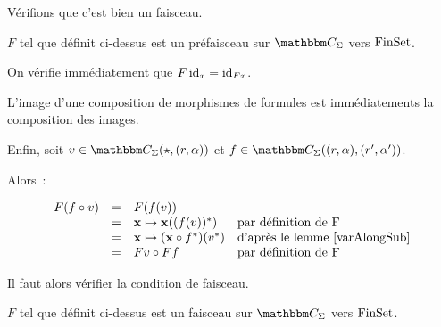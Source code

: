 Vérifions que c'est bien un faisceau.

\begin{lem}
    $F$ tel que définit ci-dessus est un préfaisceau sur $\C_\Sigma$ vers $\text{FinSet}$.
\end{lem}

\begin{pv}
    On vérifie immédiatement que $F\operatorname{id}_x = \operatorname{id}_{Fx}$.

    L'image d'une composition de morphismes de formules est immédiatements la composition
    des images.

    Enfin, soit $v\in\C_\Sigma(\star, (r,\alpha))$ et
    $f\in\C_\Sigma((r,\alpha), (r',\alpha'))$.

    Alors~:
    
    \[\begin{array}{rcll}
        F(f\circ v) & = & F(f(v)) & \\
                    & = & \mathbf{x}\mapsto \mathbf{x}((f(v))^*) 
                            & \text{par définition de F} \\
                    & = & \mathbf{x}\mapsto (\mathbf{x}\circ f^*)(v^*)
                            & \text{d'après le lemme \ref{varAlongSub}} \\
                    & = & Fv \circ Ff & \text{par définition de F} \\
    \end{array}\]
\end{pv}

Il faut alors vérifier la condition de faisceau.

\begin{lem}
    $F$ tel que définit ci-dessus est un faisceau sur $\C_\Sigma$ vers $\text{FinSet}$.
\end{lem}

